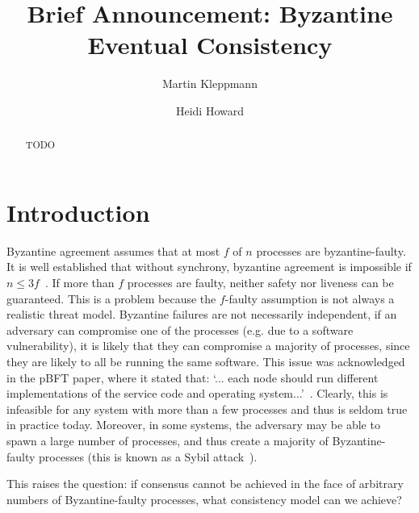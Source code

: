 \documentclass[manuscript]{acmart}
\begin{document}
\title{Brief Announcement: Byzantine Eventual Consistency}
\author{Martin Kleppmann}

\author{Heidi Howard}

\begin{abstract}
    TODO
\end{abstract}
\maketitle

\section{Introduction}

Byzantine agreement assumes that at most $f$ of $n$ processes are byzantine-faulty.
It is well established that without synchrony, byzantine agreement is impossible if $n\leq3f$~\cite{Lamport:1982,Dwork:1988,Fischer:1985}.
If more than $f$ processes are faulty, neither safety nor liveness can be guaranteed.
This is a problem because the $f$-faulty assumption is not always a realistic threat model.
Byzantine failures are not necessarily independent, if an adversary can compromise one of the processes (e.g. due to a software vulnerability), it is likely that they can compromise a majority of processes, since they are likely to all be running the same software. 
This issue was acknowledged in the pBFT paper, where it stated that: `... each node should run different implementations of the service code and operating system...'~\cite{Castro:1999}. 
Clearly, this is infeasible for any system with more than a few processes and thus is seldom true in practice today.
Moreover, in some systems, the adversary may be able to spawn a large number of processes, and thus create a majority of Byzantine-faulty processes (this is known as a Sybil attack~\cite{Douceur:2002jr}).

This raises the question: if consensus cannot be achieved in the face of arbitrary numbers of Byzantine-faulty processes, what consistency model can we achieve?
\end{document}

